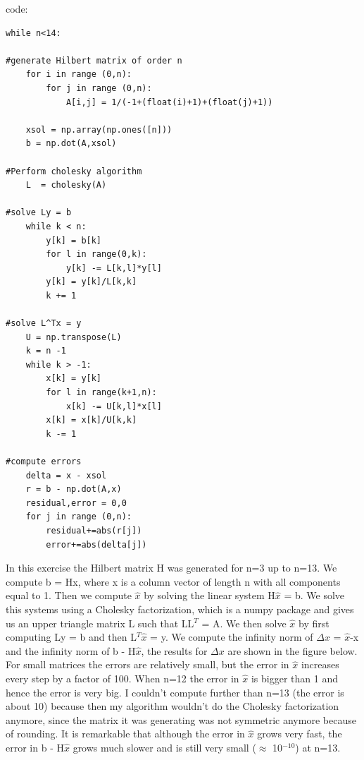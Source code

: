 \documentclass[10pt,a4paper]{article}
\begin{document}
code:
\begin{lstlisting}
while n<14:
    
#generate Hilbert matrix of order n
    for i in range (0,n):
        for j in range (0,n):
            A[i,j] = 1/(-1+(float(i)+1)+(float(j)+1))

    xsol = np.array(np.ones([n]))
    b = np.dot(A,xsol)

#Perform cholesky algorithm
    L  = cholesky(A)

#solve Ly = b
    while k < n:
        y[k] = b[k]
        for l in range(0,k):
            y[k] -= L[k,l]*y[l]
        y[k] = y[k]/L[k,k]
        k += 1

#solve L^Tx = y
    U = np.transpose(L)
    k = n -1
    while k > -1:
        x[k] = y[k]
        for l in range(k+1,n):
            x[k] -= U[k,l]*x[l]
        x[k] = x[k]/U[k,k]
        k -= 1
    
#compute errors
    delta = x - xsol
    r = b - np.dot(A,x)
    residual,error = 0,0
    for j in range (0,n):
        residual+=abs(r[j])
        error+=abs(delta[j])
\end{lstlisting}

\noindent In this exercise the Hilbert matrix H was generated for n=3 up to n=13. We compute b = Hx, where x is a column vector of length n with all components equal to 1. Then we compute $\hat{x}$ by solving the linear system H$\hat{x}$ = b. We solve this systems using a Cholesky factorization, which is a numpy package and gives us an upper triangle matrix L such that LL$^T$ = A. We then solve $\hat{x}$ by first computing Ly = b and then L$^T \hat{x}$ = y. We compute the infinity norm of $\Delta x$ = $\hat{x}$-x and the infinity norm of b - H$\hat{x}$, the results for $\Delta x$ are shown in the figure below. For small matrices the errors are relatively small, but the error in $\hat{x}$ increases every step by a factor of 100. When n=12 the error in $\hat{x}$ is bigger than 1 and hence the error is very big. I couldn't compute further than n=13 (the error is about 10) because then my algorithm wouldn't do the Cholesky factorization anymore, since the matrix it was generating was not symmetric anymore because of rounding. It is remarkable that although the error in $\hat{x}$ grows very fast, the error in b - H$\hat{x}$ grows much slower and is still very small ($\approx$ 10$^{-10}$) at n=13.
\end{document}
